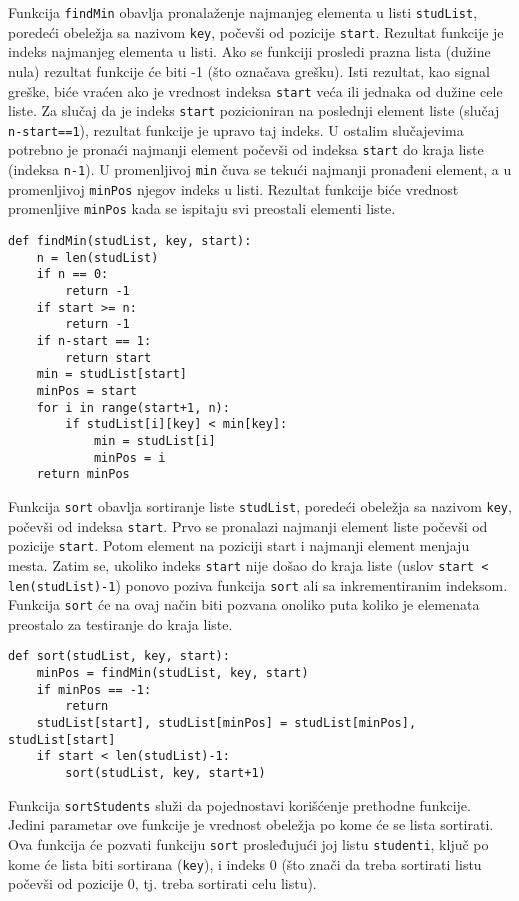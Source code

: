 \documentclass[a4paper]{article}
\begin{document}
Funkcija \texttt{findMin} obavlja pronalaženje najmanjeg elementa u listi
\texttt{studList}, poredeći obeležja sa nazivom \texttt{key}, počevši od
pozicije \texttt{start}. Rezultat funkcije je indeks najmanjeg elementa u listi.
Ako se funkciji prosledi prazna lista (dužine nula) rezultat funkcije će biti -1
(što označava grešku). Isti rezultat, kao signal greške, biće vraćen ako je
vrednost indeksa \texttt{start} veća ili jednaka od dužine cele liste. Za slučaj
da je indeks \texttt{start} pozicioniran na poslednji element liste (slučaj
\texttt{n-start==1}), rezultat funkcije je upravo taj indeks. U ostalim
slučajevima potrebno je pronaći najmanji element počevši od indeksa
\texttt{start} do kraja liste (indeksa \texttt{n-1}). U promenljivoj
\texttt{min} čuva se tekući najmanji pronađeni element, a u promenljivoj
\texttt{minPos} njegov indeks u listi. Rezultat funkcije biće vrednost
promenljive \texttt{minPos} kada se ispitaju svi preostali elementi liste.

\begin{verbatim}
def findMin(studList, key, start):
    n = len(studList)
    if n == 0:
        return -1
    if start >= n:
        return -1
    if n-start == 1:
        return start
    min = studList[start]
    minPos = start
    for i in range(start+1, n):
        if studList[i][key] < min[key]:
            min = studList[i]
            minPos = i
    return minPos
\end{verbatim}

Funkcija \texttt{sort} obavlja sortiranje liste \texttt{studList}, poredeći
obeležja sa nazivom \texttt{key}, počevši od indeksa \texttt{start}. Prvo se
pronalazi najmanji element liste počevši od pozicije \texttt{start}. Potom
element na poziciji start i najmanji element menjaju mesta. Zatim se, ukoliko
indeks \texttt{start} nije došao do kraja liste (uslov \texttt{start <
len(studList)-1}) ponovo poziva funkcija \texttt{sort} ali sa inkrementiranim
indeksom. Funkcija \texttt{sort} će na ovaj način biti pozvana onoliko puta
koliko je elemenata preostalo za testiranje do kraja liste.

\begin{verbatim}
def sort(studList, key, start):
    minPos = findMin(studList, key, start)
    if minPos == -1:
        return
    studList[start], studList[minPos] = studList[minPos], studList[start]
    if start < len(studList)-1:
        sort(studList, key, start+1)
\end{verbatim}

Funkcija \texttt{sortStudents} služi da pojednostavi korišćenje prethodne
funkcije. Jedini parametar ove funkcije je vrednost obeležja po kome će se lista
sortirati. Ova funkcija će pozvati funkciju \texttt{sort} prosleđujući joj listu
\texttt{studenti}, ključ po kome će lista biti sortirana (\texttt{key}), i
indeks 0 (što znači da treba sortirati listu počevši od pozicije 0, tj. treba
sortirati celu listu).
\end{document}
